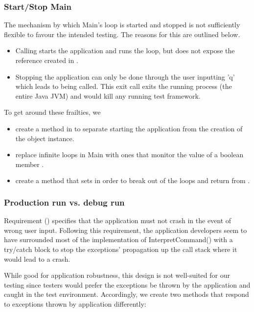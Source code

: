\subsubsection{Start/Stop Main}
\label{sec:start-stop-main}
The mechanism by which Main's loop is started and stopped is not sufficiently flexible to favour the intended testing. The reasons for this are outlined below.
\begin{itemize}
	\item Calling  starts the application and runs the loop, but does not expose the  reference created in . 
	\item Stopping the application can only be done through the user inputting 'q' which leads to  being called. This exit call exits the running process (the entire Java JVM) and would kill any running test framework.
\end{itemize}

To get around these frailties, we
\begin{itemize}
	\item create a method  in  to separate starting the application from the creation of the  object instance. 
	\item replace infinite loops in Main with ones that monitor the value of a boolean member . 
	\item create a method  that sets  in order to break out of the loops and return from .
\end{itemize}

\subsubsection{Production run vs. debug run}
\label{sec:production-vs-debug}
Requirement (\RSeven) specifies that the application must not crash in the event of wrong user input. Following this requirement, the application developers seem to have surrounded most of the implementation of InterpretCommand() with a try/catch block to stop the exceptions' propagation up the call stack where it would lead to a crash.
\par 
While good for application robustness, this design is not well-suited for our testing since testers would prefer the exceptions be thrown by the application and caught in the test environment. Accordingly, we create two  methods that respond to exceptions thrown by application differently: 

